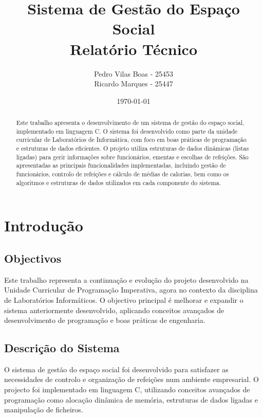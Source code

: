 \documentclass[a4paper,12pt]{report}
\begin{document}
\title{Sistema de Gestão do Espaço Social\\
       \large Relatório Técnico}
\author{Pedro Vilas Boas - 25453 \\ Ricardo Marques - 25447}
\date{\today}

\maketitle

\begin{abstract}
Este trabalho apresenta o desenvolvimento de um sistema de gestão do espaço social, implementado em linguagem C. O sistema foi desenvolvido como parte da unidade curricular de Laboratórios de Informática, com foco em boas práticas de programação e estruturas de dados eficientes. O projeto utiliza estruturas de dados dinâmicas (listas ligadas) para gerir informações sobre funcionários, ementas e escolhas de refeições. São apresentadas as principais funcionalidades implementadas, incluindo gestão de funcionários, controlo de refeições e cálculo de médias de calorias, bem como os algoritmos e estruturas de dados utilizados em cada componente do sistema.
\end{abstract}

\tableofcontents
\listoffigures
\listoftables

\chapter{Introdução}
\section{Objectivos}
Este trabalho representa a continuação e evolução do projeto desenvolvido na Unidade Curricular de Programação Imperativa, agora no contexto da disciplina de Laboratórios Informáticos. O objectivo principal é melhorar e expandir o sistema anteriormente desenvolvido, aplicando conceitos avançados de desenvolvimento de programação e boas práticas de engenharia.

\section{Descrição do Sistema}
O sistema de gestão do espaço social foi desenvolvido para satisfazer as necessidades de controlo e organização de refeições num ambiente empresarial. O projecto foi implementado em linguagem C, utilizando conceitos avançados de programação como alocação dinâmica de memória, estruturas de dados ligadas e manipulação de ficheiros.
\end{document}
